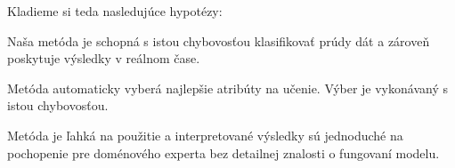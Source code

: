 Kladieme si teda nasledujúce hypotézy:
\begin{hypothesis}{Naša metóda je schopná s istou chybovosťou klasifikovať prúdy dát a zároveň poskytuje výsledky v reálnom čase.}
\end{hypothesis}
\begin{hypothesis}{Metóda automaticky vyberá najlepšie atribúty na učenie. Výber je vykonávaný s istou chybovosťou.}
\end{hypothesis}
\begin{hypothesis}{Metóda je ľahká na použitie a interpretované výsledky sú jednoduché na pochopenie pre doménového experta bez detailnej znalosti o fungovaní modelu.}
\end{hypothesis}





